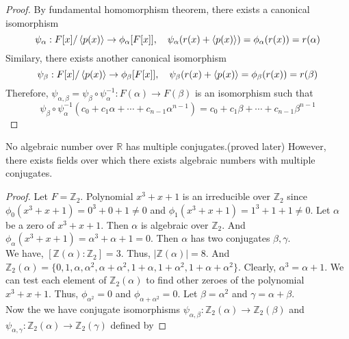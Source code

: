 \begin{proof}
	By fundamental homomorphism theorem, there exists a canonical isomorphism 
	\[ \psi_\alpha : F[x]/\left\langle p(x)\right\rangle \to \phi_\alpha[F[x]],\quad \psi_\alpha(r(x) + \left\langle p(x)\right\rangle) = \phi_\alpha(r(x)) = r(\alpha) \]
	Similary, there exists another canonical isomorphism
	\[ \psi_\beta : F[x]/\left\langle p(x)\right\rangle \to \phi_\beta[F[x]],\quad \psi_\beta(r(x) + \left\langle p(x)\right\rangle = \phi_\beta(r(x)) = r(\beta) \]
	Therefore, $\psi_{\alpha,\beta} = \psi_\beta \circ \psi_\alpha^{-1} : F(\alpha) \to F(\beta)$ is an isomorphism such that
	\[ \psi_\beta \circ \psi_\alpha^{-1} (c_0 + c_1 \alpha + \dotsb +c_{n-1}\alpha^{n-1}) = c_0 + c_1 \beta + \dotsb + c_{n-1} \beta^{n-1} \]
\end{proof}

\begin{commentary}
\begin{challenge}
	No algebraic number over $\mathbb{R}$ has multiple conjugates.(proved later)
	However, there exists fields over which there exists algebraic numbers with multiple conjugates.
\end{challenge}
\begin{proof}
	Let $F = \mathbb{Z}_2$.
	Polynomial $x^3+x+1$ is an irreducible over $\mathbb{Z}_2$ since $\phi_0(x^3+x+1) = 0^3+0+1 \ne 0$ and $\phi_1(x^3+x+1) = 1^3+1+1 \ne 0$.
	Let $\alpha$ be a zero of $x^3+x+1$.
	Then $\alpha$ is algebraic over $\mathbb{Z}_2$.
	And $\phi_\alpha(x^3+x+1) = \alpha^3+\alpha+1 = 0$.
	Then $\alpha$ has two conjugates $\beta,\gamma$.\\

	We have, $[\mathbb{Z}(\alpha):\mathbb{Z}_2] = 3$.
	Thus, $|\mathbb{Z}(\alpha)| = 8$.
	And $\mathbb{Z}_2(\alpha) = \{ 0,1,\alpha,\alpha^2,\alpha+\alpha^2,1+\alpha,1+\alpha^2,1+\alpha+\alpha^2 \}$.
	Clearly, $\alpha^3 = \alpha+1$.
	We can test each element of $\mathbb{Z}_2(\alpha)$ to find other zeroes of the polynomial $x^3+x+1$.
	Thus, $\phi_{\alpha^2} = 0$ and $\phi_{\alpha+\alpha^2} = 0$.
	Let $\beta = \alpha^2$ and $\gamma = \alpha+\beta$.\\

	Now the we have conjugate isomorphisms $\psi_{\alpha,\beta} : \mathbb{Z}_2(\alpha) \to \mathbb{Z}_2(\beta)$ and $\psi_{\alpha,\gamma} : \mathbb{Z}_2(\alpha) \to \mathbb{Z}_2(\gamma)$ defined by


\end{proof}
\end{commentary}
